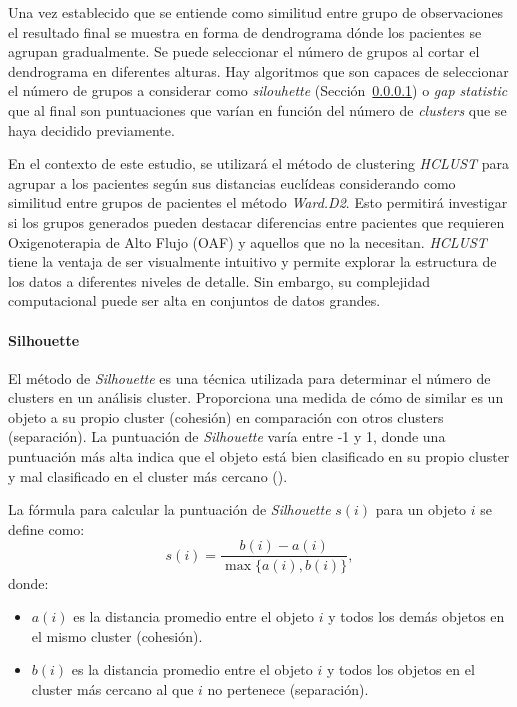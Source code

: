 {Una vez establecido que se entiende como similitud entre grupo de observaciones el resultado final se muestra en forma de dendrograma dónde los pacientes se agrupan gradualmente. Se puede seleccionar el número de grupos al cortar el dendrograma en diferentes alturas. Hay algoritmos que son capaces de seleccionar el número de grupos a considerar como \textit{silouhette} (Sección~\ref{sec:silhouette}) o \textit{gap statistic} que al final son puntuaciones que varían en función del número de \textit{clusters} que se haya decidido previamente.



En el contexto de este estudio, se utilizará el método de clustering \textit{HCLUST} para agrupar a los pacientes según sus distancias euclídeas considerando como similitud entre grupos de pacientes el método \textit{Ward.D2}. Esto permitirá investigar si los grupos generados pueden destacar diferencias entre pacientes que requieren Oxigenoterapia de Alto Flujo (OAF) y aquellos que no la necesitan. \textit{HCLUST} tiene la ventaja de ser visualmente intuitivo y permite explorar la estructura de los datos a diferentes niveles de detalle. Sin embargo, su complejidad computacional puede ser alta en conjuntos de datos grandes.

\paragraph{Silhouette}\label{sec:silhouette}

El método de \textit{Silhouette} es una técnica utilizada para determinar el número de clusters en un análisis cluster. Proporciona una medida de cómo de similar es un objeto a su propio cluster (cohesión) en comparación con otros clusters (separación). La puntuación de \textit{Silhouette} varía entre -1 y 1, donde una puntuación más alta indica que el objeto está bien clasificado en su propio cluster y mal clasificado en el cluster más cercano (\cite{rousseeuw1987silhouettes}).

La fórmula para calcular la puntuación de \textit{Silhouette} \(s(i)\) para un objeto \(i\) se define como:
\[ s(i) = \frac{b(i) - a(i)}{\max\{a(i), b(i)\}},\]
donde:
\begin{itemize}
    \item \(a(i)\) es la distancia promedio entre el objeto \(i\) y todos los demás objetos en el mismo cluster (cohesión).
    \item \(b(i)\) es la distancia promedio entre el objeto \(i\) y todos los objetos en el cluster más cercano al que \(i\) no pertenece (separación).
\end{itemize}

}

